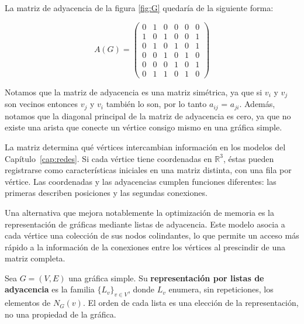 \begin{example}
    La matriz de adyacencia de la figura \ref{fig:G} quedaría de la siguiente forma:
\begin{center}
\begin{equation}
A(G) =
\begin{pmatrix}
0 & 1 & 0 & 0 & 0 & 0\\
1 & 0 & 1 & 0 & 0 & 1\\
0 & 1 & 0 & 1 & 0 & 1\\
0 & 0 & 1 & 0 & 1 & 0\\
0 & 0 & 0 & 1 & 0 & 1\\
0 & 1 & 1 & 0 & 1 & 0
\end{pmatrix}
\end{equation}
    
\end{center}
\end{example}
\noindent Notamos que la matriz de adyacencia es una matriz simétrica, ya que si $v_i$ y $v_j$ son vecinos entonces $v_j$ y $v_i$ también lo son, por lo tanto $a_{ij}$ = $a_{ji}$.
\noindent Además, notamos que la diagonal principal de la matriz de adyacencia es cero, ya que no existe una arista que conecte un vértice consigo mismo en una gráfica simple.

La matriz determina qué vértices intercambian información en los modelos del Capítulo~\ref{cap:redes}. Si cada vértice tiene coordenadas en $\mathbb{R}^3$, éstas pueden registrarse como características iniciales en una matriz distinta, con una fila por vértice. Las coordenadas y las adyacencias cumplen funciones diferentes: las primeras describen posiciones y las segundas conexiones.

Una alternativa que mejora notablemente la optimización de memoria es la representación de gráficas mediante listas de adyacencia. Este modelo asocia a cada vértice una colección de sus nodos colindantes, lo que permite un acceso más rápido a la información de la conexiones entre los vértices al prescindir de una matriz completa.

\begin{definition}
\label{def:lista-adyacencia}
Sea $G=(V,E)$ una gráfica simple. Su \textbf{representación por listas de adyacencia} es la familia $\{L_v\}_{v\in V}$, donde $L_v$ enumera, sin repeticiones, los elementos de $N_G(v)$. El orden de cada lista es una elección de la representación, no una propiedad de la gráfica.
\end{definition}

